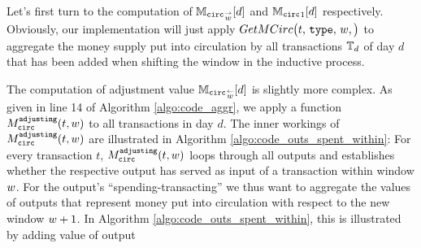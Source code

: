 Let's first turn to the computation of \({{\mathbb{M}_{\mathtt{circ}}}_{\overset{\rightarrow}{{w}}}}[d]\) and \({\mathbb{M}_{\mathtt{circ}}}_{1}[d]\) respectively. %
Obviously, our implementation will just apply \(GetMCirc\bigl(t,\,{\mathtt{type}},\,{w},\bigr)\) to aggregate the money supply put into circulation by all transactions \({{\mathbb{T}}_{d}}\) of day \(d\) that has been added when shifting the window in the inductive process. %

The computation of adjustment value \({{\mathbb{M}_{\mathtt{circ}}}_{\overset{\leftarrow}{{w}}}}[d]\) is slightly more complex. %
As given in line 14 of Algorithm \ref{algo:code_aggr}, we apply a function \({M_{\mathtt{circ}}^{\mathtt{adjusting}}}(t,w)\) to all transactions in day \(d\). %
The inner workings of \({M_{\mathtt{circ}}^{\mathtt{adjusting}}}(t,w)\) are illustrated in Algorithm \ref{algo:code_outs_spent_within}: %
For every transaction \(t\), \({M_{\mathtt{circ}}^{\mathtt{adjusting}}}(t,w)\) loops through all outputs and establishes whether the respective output has served as input of a transaction within window \({w}\). %
For the output's ``spending-transacting'' we thus want to aggregate the values of outputs that represent money put into circulation with respect to the new window \({w} + 1\). %
In Algorithm \ref{algo:code_outs_spent_within}, this is illustrated by adding value of output 




